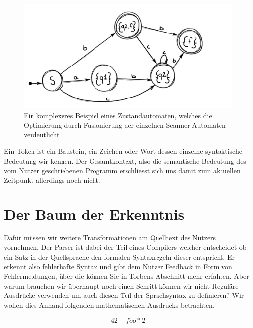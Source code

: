 \documentclass[a4paper, 12pt]{article}
\begin{document}
\begin{figure}[h]
  \caption{Ein komplexeres Beispiel eines Zustandautomaten, welches die
Optimierung durch Fusionierung der einzelnen Scanner-Automaten verdeutlicht}
  \includegraphics[scale=0.25]{dfa}
\end{figure}


Ein Token ist ein Baustein, ein Zeichen oder Wort dessen einzelne syntaktische Bedeutung wir kennen. Der Gesamtkontext, also die semantische Bedeutung des
vom Nutzer geschriebenen Programm erschliesst sich uns damit zum aktuellen Zeitpunkt allerdings noch nicht.

\newpage
\section{Der Baum der Erkenntnis}

Daf\"ur m\"ussen wir weitere Transformationen am Quelltext des Nutzers
vornehmen. Der Parser ist dabei der Teil eines Compilers welcher
entscheidet ob ein Satz in der Quellsprache den formalen Syntaxregeln dieser entspricht. Er erkennt also fehlerhafte Syntax und gibt dem Nutzer Feedback in Form von
Fehlermeldungen, \"uber die k\"onnen Sie in Torbens Abschnitt mehr erfahren.
Aber warum brauchen wir \"uberhaupt noch einen Schritt k\"onnen wir nicht
Regul\"are Ausdr\"ucke verwenden um auch diesen Teil der Sprachsyntax zu
definieren? Wir wollen dies Anhand folgenden mathematischen Ausdrucks betrachten.

\begin{equation}
    42 + foo * 2
\end{equation}
\end{document}
